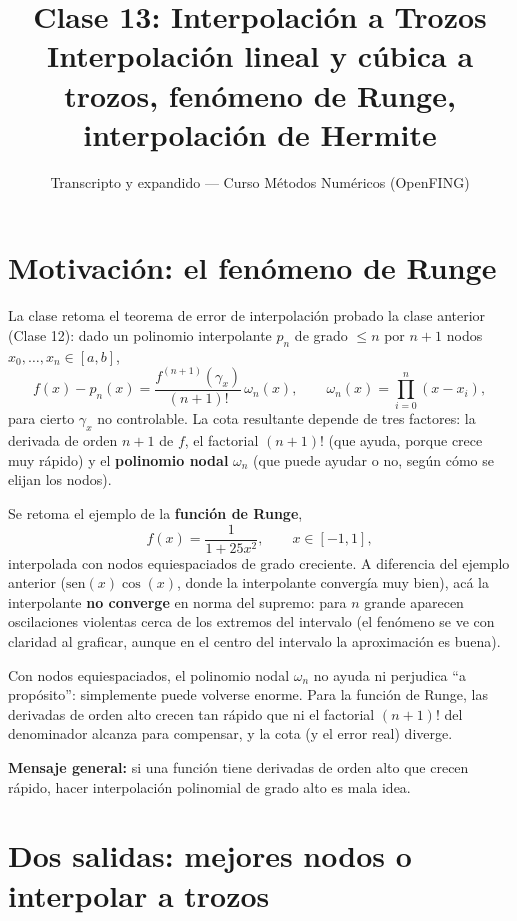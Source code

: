 \documentclass[12pt,a4paper]{article}
\title{\textbf{Clase 13: Interpolación a Trozos} \\[0.3em]
        \large{Interpolación lineal y cúbica a trozos, fenómeno de Runge, interpolación de Hermite}}
\author{Transcripto y expandido --- Curso Métodos Numéricos (OpenFING)}
\date{}
\begin{document}
\maketitle
\thispagestyle{empty}
\newpage

\tableofcontents
\newpage

\section{Motivación: el fenómeno de Runge}

La clase retoma el teorema de error de interpolación probado la clase
anterior (Clase 12): dado un polinomio interpolante $p_n$ de grado $\le n$
por $n+1$ nodos $x_0,\dots,x_n \in [a,b]$,
\[
f(x) - p_n(x) = \frac{f^{(n+1)}(\gamma_x)}{(n+1)!}\,\omega_n(x), \qquad \omega_n(x) = \prod_{i=0}^n (x-x_i),
\]
para cierto $\gamma_x$ no controlable. La cota resultante depende de tres
factores: la derivada de orden $n+1$ de $f$, el factorial $(n+1)!$ (que
ayuda, porque crece muy rápido) y el \textbf{polinomio nodal} $\omega_n$
(que puede ayudar o no, según cómo se elijan los nodos).

Se retoma el ejemplo de la \textbf{función de Runge},
\[
f(x) = \frac{1}{1+25x^2}, \qquad x \in [-1,1],
\]
interpolada con nodos equiespaciados de grado creciente. A diferencia del
ejemplo anterior ($\mathrm{sen}(x)\cos(x)$, donde la interpolante convergía
muy bien), acá la interpolante \textbf{no converge} en norma del supremo:
para $n$ grande aparecen oscilaciones violentas cerca de los extremos del
intervalo (el fenómeno se ve con claridad al graficar, aunque en el centro
del intervalo la aproximación es buena).

\begin{notebox}
Con nodos equiespaciados, el polinomio nodal $\omega_n$ no ayuda ni
perjudica ``a propósito'': simplemente puede volverse enorme. Para la
función de Runge, las derivadas de orden alto crecen tan rápido que ni el
factorial $(n+1)!$ del denominador alcanza para compensar, y la cota (y el
error real) diverge.
\end{notebox}

\noindent\textbf{Mensaje general:} si una función tiene derivadas de orden
alto que crecen rápido, hacer interpolación polinomial de grado alto es mala
idea.

\section{Dos salidas: mejores nodos o interpolar a trozos}
\end{document}
